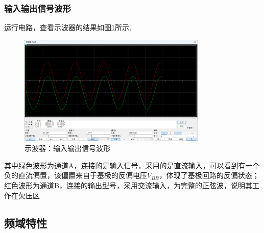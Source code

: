 \documentclass[UTF8]{ctexart}
\begin{document}
\subsubsection{输入输出信号波形}
运行电路，查看示波器的结果如图\ref{img:4}所示,
\begin{figure}[htbp]
    \centering
    \includegraphics[width=0.8\textwidth]{4.png}
    \caption{示波器：输入输出信号波形}
    \label{img:4}
\end{figure}
其中绿色波形为通道A，连接的是输入信号，采用的是直流输入，可以看到有一个负的直流偏置，该偏置来自于基极的反偏电压$V_{BB}$，体现了基极回路的反偏状态；
红色波形为通道B，连接的输出型号，采用交流输入，为完整的正弦波，说明其工作在欠压区
\subsection{频域特性}
\end{document}
